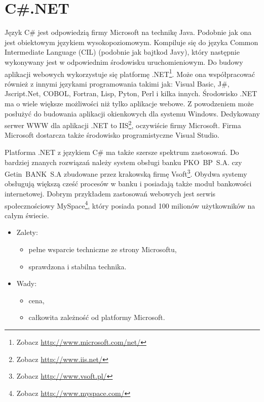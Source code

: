 \documentclass[a4paper,12pt,oneside]{report}
\begin{document}
\section{C\#.NET}
\label{sec:dotnet}
Język C\# jest odpowiedzią firmy Microsoft na technikę Java. Podobnie jak ona jest obiektowym językiem wysokopoziomowym. Kompiluje się do języka Common Intermediate Language (CIL) (podobnie jak bajtkod Javy), który następnie wykonywany jest w odpowiednim środowisku uruchomieniowym. Do budowy aplikacji webowych wykorzystuje się platformę .NET\footnote{Zobacz \url{http://www.microsoft.com/net/}}. Może ona współpracować również z innymi językami programowania takimi jak: Visual Basic, J\#, Jscript.Net, COBOL, Fortran, Lisp, Pyton, Perl i kilka innych. Środowisko .NET ma o wiele większe możliwości niż tylko aplikacje webowe. Z powodzeniem może posłużyć do budowania aplikacji okienkowych dla systemu Windows. Dedykowany serwer WWW dla aplikacji .NET to IIS\footnote{Zobacz \url{http://www.iis.net/}}, oczywiście firmy Microsoft. Firma Microsoft dostarcza także środowisko programistyczne Visual Studio.

Platforma .NET z językiem C\#  ma także szersze spektrum zastosowań. Do bardziej znanych rozwiązań należy system obsługi banku PKO~BP~S.A. czy Getin~BANK~S.A zbudowane przez krakowską firmę Vsoft\footnote{Zobacz \url{http://www.vsoft.pl/}}. Obydwa systemy obsługują większą cześć procesów w banku i posiadają także moduł bankowości internetowej. Dobrym przykładem zastosowań webowych jest serwis społecznościowy MySpace\footnote{Zobacz \url{http://www.myspace.com/}}, który posiada ponad 100 milionów użytkowników na całym świecie.
\begin{itemize}
\item Zalety:
  \begin{itemize}
  \item pełne wsparcie techniczne ze strony Microsoftu,
  \item sprawdzona i stabilna technika.
  \end{itemize}
\item Wady:
  \begin{itemize}
  \item cena,
  \item całkowita zależność od platformy Microsoft.
  \end{itemize}
\end{itemize}
\end{document}
